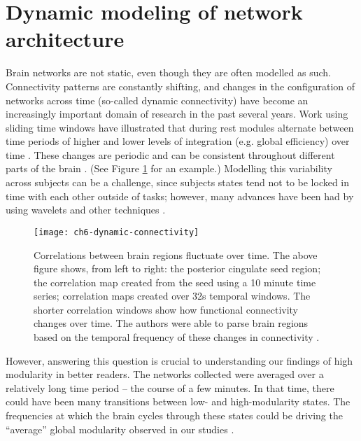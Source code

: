 \section{Dynamic modeling of network architecture}

Brain networks are not static, even though they are often modelled as such. Connectivity patterns are constantly shifting, and changes in the configuration of networks across time (so-called dynamic connectivity) have become an increasingly important domain of research in the past several years. Work using sliding time windows have illustrated that during rest modules alternate between time periods of higher and lower levels of integration (e.g. global efficiency) over time \citep{Zalesky2014}. These changes are periodic and can be consistent throughout different parts of the brain \citep{Handwerker2012}. (See Figure \ref{fig:ch6-dynamic-connectivity} for an example.) Modelling this variability across subjects can be a challenge, since subjects states tend not to be locked in time with each other outside of tasks; however, many advances have been had by using wavelets and other techniques \citep{Zalesky2014}. 

\begin{figure}[t]
	\centering
	\texttt{[image: ch6-dynamic-connectivity]}
	\caption[Correlations between brain regions fluctuate over time.]{Correlations between brain regions fluctuate over time. The above figure shows, from left to right: the posterior cingulate seed region; the correlation map created from the seed using a 10 minute time series; correlation maps created over 32s temporal windows. The shorter correlation windows show how functional connectivity changes over time. The authors were able to parse brain regions based on the temporal frequency of these changes in connectivity \citep{Handwerker2012}.}
	\label{fig:ch6-dynamic-connectivity}
\end{figure}

However, answering this question is crucial to understanding our findings of high modularity in better readers. The networks collected were averaged over a relatively long time period -- the course of a few minutes. In that time, there could have been many transitions between low- and high-modularity states. The frequencies at which the brain cycles through these states could be driving the ``average'' global modularity observed in our studies \citep{Fries2005}.

